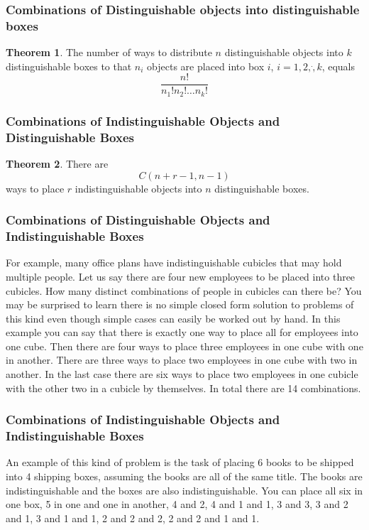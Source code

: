 \documentclass[11pt]{book} %
\theoremstyle {definition}
\newtheorem {theorem}{Theorem}[section]
\theoremstyle {remark}
\begin{document}
\subsubsection {Combinations of Distinguishable objects into distinguishable boxes}
\begin{theorem}
The number of ways to distribute $n$ distinguishable objects into $k$ distinguishable boxes to that $n_i$ objects are placed into box $i$, $i=1,2, \dot ,k$, equals
$$ \frac{n!}{n_1!n_2! \dots n_k!}$$
\end {theorem}

\subsubsection{Combinations of Indistinguishable Objects and Distinguishable Boxes}
\begin{theorem}
There are 
$$C(n+r-1,n-1)$$
ways to place $r$ indistinguishable objects into $n$ distinguishable boxes.
\end{theorem}

\subsubsection{Combinations of Distinguishable Objects and Indistinguishable Boxes}
For example, many office plans have indistinguishable cubicles that may hold multiple people. Let us say there are four new employees to be placed into three cubicles. How many distinct combinations of people in cubicles can there be? You may be surprised to learn there is no simple closed form solution to problems of this kind even though simple cases can easily be worked out by hand. In this example you can say that there is exactly one way to place all for employees into one cube. Then there are four ways to place three employees in one cube with one in another. There are three ways to place two employees in one cube with two in another. In the last case there are six ways to place two employees in one cubicle with the other two in a cubicle by themselves. In total there are 14 combinations. 

\subsubsection{Combinations of Indistinguishable Objects and Indistinguishable Boxes}
An example of this kind of problem is the task of placing 6 books to be shipped into 4 shipping boxes, assuming the books are all of the same title. The books are indistinguishable and the boxes are also indistinguishable. You can place all six in one box, 5 in one and one in another, 4 and 2, 4 and 1 and 1, 3 and 3, 3 and 2 and 1, 3 and 1 and 1, 2 and 2 and 2, 2 and 2 and 1 and 1. 
\end{document}
